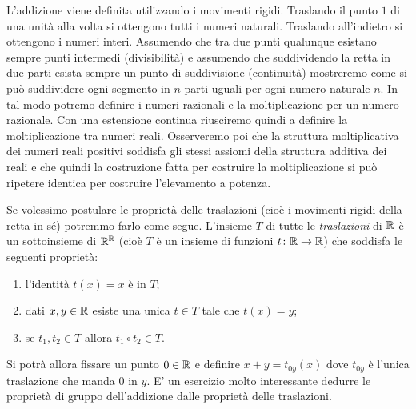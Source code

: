 L'addizione viene definita utilizzando i movimenti rigidi.
Traslando il punto $1$ di una unità alla volta si ottengono tutti i numeri naturali.
Traslando all'indietro si ottengono i numeri interi. 
Assumendo che tra due punti qualunque esistano sempre punti intermedi (divisibilità) e
assumendo che suddividendo la retta in due parti esista sempre un punto di 
suddivisione (continuità) mostreremo come si può suddividere 
ogni segmento in $n$ parti uguali per ogni numero naturale $n$. 
In tal modo potremo definire i numeri razionali e la moltiplicazione per un numero razionale.
Con una estensione continua riusciremo quindi a definire la moltiplicazione 
tra numeri reali. 
Osserveremo poi che la struttura moltiplicativa dei numeri reali positivi soddisfa 
gli stessi assiomi della struttura additiva dei reali e che quindi la costruzione fatta 
per costruire la moltiplicazione si può ripetere identica per costruire l'elevamento a potenza.

Se volessimo postulare le proprietà delle traslazioni (cioè i movimenti rigidi della retta in sé)
potremmo farlo come segue. L'insieme $T$ di tutte le \emph{traslazioni} di 
$\mathbb R$ è un sottoinsieme di $\mathbb R^\mathbb R$ (cioè $T$ è un insieme di funzioni $t\colon \mathbb R\to\mathbb R$)
che soddisfa le seguenti proprietà:
\begin{enumerate}
  \item l'identità $t(x)=x$ è in $T$;
  \item dati $x,y\in \mathbb R$ esiste una unica $t\in T$ tale che $t(x)=y$;
  \item se $t_1,t_2\in T$ allora $t_1\circ t_2 \in T$.
\end{enumerate}
Si potrà allora fissare un punto $0\in \mathbb R$ e definire $x+y = t_{0y}(x)$
dove $t_{0y}$ è l'unica traslazione che manda $0$ in $y$. 
E' un esercizio molto interessante dedurre le proprietà di gruppo dell'addizione 
dalle proprietà delle traslazioni.

